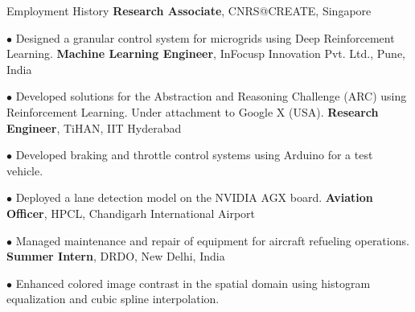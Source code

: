 \begin{rubric}{Employment History}
\entry*[2022 -- 2023]%
	\textbf{Research Associate}, CNRS@CREATE, Singapore  
    \par $\bullet$ Designed a granular control system for microgrids using Deep Reinforcement Learning.  
\entry*[2021 -- 2022]%
	\textbf{Machine Learning Engineer}, InFocusp Innovation Pvt. Ltd., Pune, India  
    \par $\bullet$ Developed solutions for the Abstraction and Reasoning Challenge (ARC) using Reinforcement Learning. Under attachment to Google X (USA). 
\entry*[2021 -- 2021]%
	\textbf{Research Engineer}, TiHAN, IIT Hyderabad  
    \par $\bullet$ Developed braking and throttle control systems using Arduino for a test vehicle.  
    \par $\bullet$ Deployed a lane detection model on the NVIDIA AGX board.  
\entry*[2016 -- 2018]%
	\textbf{Aviation Officer}, HPCL, Chandigarh International Airport  
    \par $\bullet$ Managed maintenance and repair of equipment for aircraft refueling operations.  
\entry*[2015 -- 2015]%
	\textbf{Summer Intern}, DRDO, New Delhi, India  
    \par $\bullet$ Enhanced colored image contrast in the spatial domain using histogram equalization and cubic spline interpolation.  
\end{rubric}

